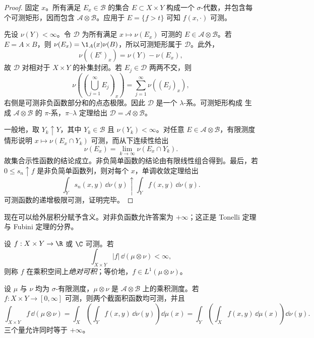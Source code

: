 \begin{proof}
固定 $x$。所有满足 $E_x\in\mathcal B$ 的集合 $E\subset X\times Y$ 构成一个
$\sigma$-代数，并包含每个可测矩形，因而包含 $\mathcal A\otimes\mathcal B$。应用于
$E=\{f>t\}$ 可知 $f(x,\cdot)$ 可测。

先设 $\nu(Y)<\infty$。令 $\mathcal D$ 为所有满足
$x\mapsto\nu(E_x)$ 可测的 $E\in\mathcal A\otimes\mathcal B$。若 $E=A\times B$，则
$\nu(E_x)=\1_A(x)\nu(B)$，所以可测矩形属于 $\mathcal D$。此外，
\[
 \nu((E^c)_x)=\nu(Y)-\nu(E_x),
\]
故 $\mathcal D$ 对相对于 $X\times Y$ 的补集封闭。若 $E_j\in\mathcal D$ 两两不交，则
\[
 \nu\!\left(\left(\bigcup_{j=1}^{\infty}E_j\right)_x\right)
 =\sum_{j=1}^{\infty}\nu((E_j)_x),
\]
右侧是可测非负函数部分和的点态极限。因此 $\mathcal D$ 是一个 $\lambda$-系。可测矩形构成
生成 $\mathcal A\otimes\mathcal B$ 的 $\pi$-系，$\pi$--$\lambda$ 定理给出
$\mathcal D=\mathcal A\otimes\mathcal B$。

一般地，取 $Y_k\uparrow Y$，其中 $Y_k\in\mathcal B$ 且 $\nu(Y_k)<\infty$。对任意
$E\in\mathcal A\otimes\mathcal B$，有限测度情形说明
$x\mapsto\nu(E_x\cap Y_k)$ 可测，而从下连续性给出
\[
 \nu(E_x)=\lim_{k\to\infty}\nu(E_x\cap Y_k).
\]
故集合示性函数的结论成立。非负简单函数的结论由有限线性组合得到。最后，若
$0\le s_n\uparrow f$ 是非负简单函数列，则对每个 $x$，单调收敛定理给出
\[
 \int_Ys_n(x,y)\,\dd\nu(y)\uparrow
 \int_Yf(x,y)\,\dd\nu(y).
\]
可测函数的递增极限可测，证明完毕。
\end{proof}

现在可以给外层积分赋予含义。对非负函数允许答案为 $+\infty$；这正是 Tonelli 定理与
Fubini 定理的分界。

\begin{definition}[乘积空间上的绝对可积]\label{def:3-2-1-2}
设 $f:X\times Y\to\R$ 或 $\C$ 可测。若
\[
 \int_{X\times Y}|f|\,\dd(\mu\otimes\nu)<\infty,
\]
则称 $f$ 在乘积空间上\emph{绝对可积}；等价地，$f\in L^1(\mu\otimes\nu)$。
\end{definition}

\begin{theorem}[Tonelli 定理]\label{theorem:3-2-1-1}
设 $\mu$ 与 $\nu$ 均为 $\sigma$-有限测度，$\mu\otimes\nu$ 是
$\mathcal A\otimes\mathcal B$ 上的乘积测度。若
$f:X\times Y\to[0,\infty]$ 可测，则两个截面积函数均可测，并且
\[
 \int_{X\times Y}f\,\dd(\mu\otimes\nu)
 =\int_X\!\left(\int_Yf(x,y)\,\dd\nu(y)\right)\dd\mu(x)
 =\int_Y\!\left(\int_Xf(x,y)\,\dd\mu(x)\right)\dd\nu(y).
 \tag{3.2.2}\label{eq:tonelli}
\]
三个量允许同时等于 $+\infty$。
\end{theorem}

